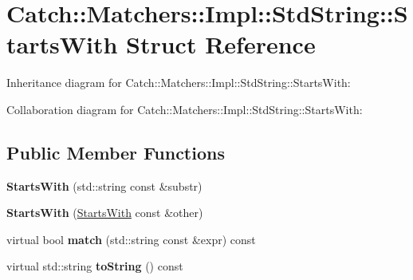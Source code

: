 \hypertarget{struct_catch_1_1_matchers_1_1_impl_1_1_std_string_1_1_starts_with}{}\section{Catch\+:\+:Matchers\+:\+:Impl\+:\+:Std\+String\+:\+:Starts\+With Struct Reference}
\label{struct_catch_1_1_matchers_1_1_impl_1_1_std_string_1_1_starts_with}


Inheritance diagram for Catch\+:\+:Matchers\+:\+:Impl\+:\+:Std\+String\+:\+:Starts\+With\+:


Collaboration diagram for Catch\+:\+:Matchers\+:\+:Impl\+:\+:Std\+String\+:\+:Starts\+With\+:
\subsection*{Public Member Functions}
\begin{DoxyCompactItemize}
\item 
\hypertarget{struct_catch_1_1_matchers_1_1_impl_1_1_std_string_1_1_starts_with_a1940dacb184d129adb33acea73dedc17}{}{\bfseries Starts\+With} (std\+::string const \&substr)\label{struct_catch_1_1_matchers_1_1_impl_1_1_std_string_1_1_starts_with_a1940dacb184d129adb33acea73dedc17}

\item 
\hypertarget{struct_catch_1_1_matchers_1_1_impl_1_1_std_string_1_1_starts_with_a5526cb587632e7e46253d6f60ae01098}{}{\bfseries Starts\+With} (\hyperlink{struct_catch_1_1_matchers_1_1_impl_1_1_std_string_1_1_starts_with}{Starts\+With} const \&other)\label{struct_catch_1_1_matchers_1_1_impl_1_1_std_string_1_1_starts_with_a5526cb587632e7e46253d6f60ae01098}

\item 
\hypertarget{struct_catch_1_1_matchers_1_1_impl_1_1_std_string_1_1_starts_with_ae9c893adbacc853171a488aea5355653}{}virtual bool {\bfseries match} (std\+::string const \&expr) const \label{struct_catch_1_1_matchers_1_1_impl_1_1_std_string_1_1_starts_with_ae9c893adbacc853171a488aea5355653}

\item 
\hypertarget{struct_catch_1_1_matchers_1_1_impl_1_1_std_string_1_1_starts_with_a066fe10e74495cb556abc6895193ba97}{}virtual std\+::string {\bfseries to\+String} () const \label{struct_catch_1_1_matchers_1_1_impl_1_1_std_string_1_1_starts_with_a066fe10e74495cb556abc6895193ba97}

\end{DoxyCompactItemize}
